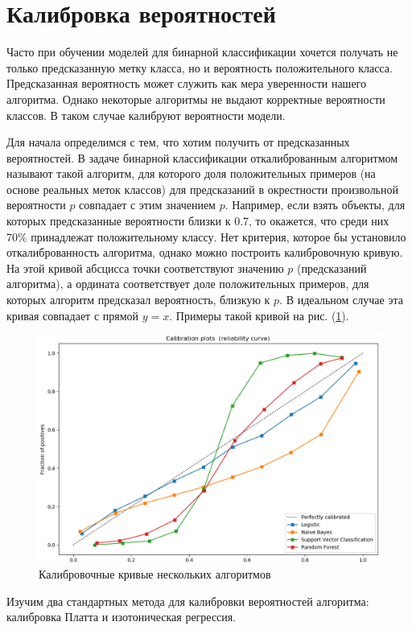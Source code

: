 \documentclass[12pt,a4paper]{article}
\begin{document}
\section{Калибровка вероятностей}

Часто при обучении моделей для бинарной классификации хочется получать не только предсказанную метку класса, но и вероятность положительного класса. Предсказанная вероятность может служить как мера уверенности нашего алгоритма. Однако некоторые алгоритмы не выдают корректные вероятности классов. В таком случае калибруют вероятности модели.

Для начала определимся с тем, что хотим получить от предсказанных вероятностей. В задаче бинарной классификации откалиброванным алгоритмом называют такой алгоритм, для которого доля положительных примеров (на основе реальных меток классов) для предсказаний в окрестности произвольной вероятности $p$ совпадает с этим значением $p$. Например, если взять объекты, для которых предсказанные вероятности близки к 0.7, то окажется, что среди них 70\% принадлежат положительному классу. Нет критерия, которое бы установило откалиброванность алгоритма, однако можно построить калибровочную кривую. На этой кривой абсцисса точки соответствуют значению $p$ (предсказаний алгоритма), а ордината соответствует доле положительных примеров, для которых алгоритм предсказал вероятность, близкую к $p$. В идеальном случае эта кривая совпадает с прямой $y = x$. Примеры такой кривой на рис. (\ref{fig:plot}).

\begin{center}
\begin{figure}[!htb]
 \centering
 \includegraphics[width=0.7\linewidth]{img/calibration_plot.eps}
 \caption{Калибровочные кривые нескольких алгоритмов}\label{fig:plot}
\end{figure}
\end{center}

Изучим два стандартных метода для калибровки вероятностей алгоритма: калибровка Платта и изотоническая регрессия.
\end{document}
